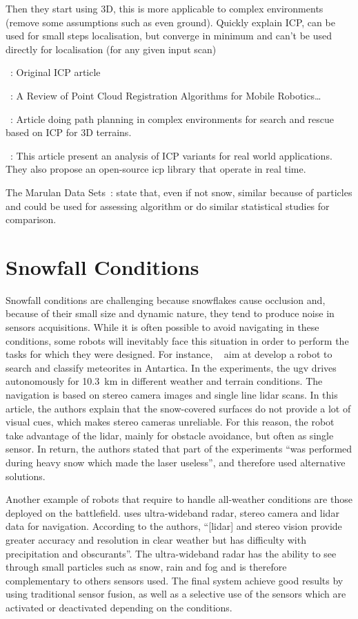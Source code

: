 Then they start using 3D, this is more applicable to complex environments (remove some assumptions such as even ground).
Quickly explain ICP, can be used for small steps localisation, but converge in minimum and can't be used directly for localisation (for any given input scan)

~\cite{Besl1992}:
Original ICP article

~\cite{Pomerleau2015a}:
A Review of Point Cloud Registration Algorithms for Mobile Robotics\dots

~\cite{Colas2013}:
Article doing path planning in complex environments for search and rescue based on ICP for 3D terrains. 

~\cite{Pomerleau2013}:
This article present an analysis of ICP variants for real world applications. They also propose an open-source icp library that operate in real time.  

The Marulan Data Sets~\citep{Peynot2010}: state that, even if not snow, similar because of particles and could be used for assessing algorithm or do similar statistical studies for comparison. 


\section{Snowfall Conditions}
\label{sec:literature_snow}

Snowfall conditions are challenging because snowflakes cause occlusion and, because of their small size and dynamic nature, they tend to produce noise in sensors acquisitions. While it is often possible to avoid navigating in these conditions, some robots will inevitably face this situation in order to perform the tasks for which they were designed. For instance, ~\citet{Moorehead_1999_2122} aim at develop a robot to search and classify meteorites in Antartica. In the experiments, the \gls*{ugv} drives autonomously for \SI{10.3}{\kilo\meter} in different weather and terrain conditions. The navigation is based on stereo camera images and single line \gls*{lidar} scans. In this article, the authors explain that the snow-covered surfaces do not provide a lot of visual cues, which makes stereo cameras unreliable. For this reason, the robot take advantage of the \gls*{lidar}, mainly for obstacle avoidance, but often as single sensor. In return, the authors stated that part of the experiments \enquote{was performed during heavy snow which made the laser useless}, and therefore used alternative solutions. 

Another example of robots that require to handle all-weather conditions are those deployed on the battlefield. \citet{yamauchi2010fusing} uses ultra-wideband radar, stereo camera and \gls*{lidar} data for navigation. According to the authors, \enquote{[\gls*{lidar}] and stereo vision provide greater accuracy and resolution in clear weather but has difficulty with precipitation and obscurants}. The ultra-wideband radar has the ability to see through small particles such as snow, rain and fog and is therefore complementary to others sensors used. The final system achieve good results by using traditional sensor fusion, as well as a selective use of the sensors which are activated or deactivated depending on the conditions. 

